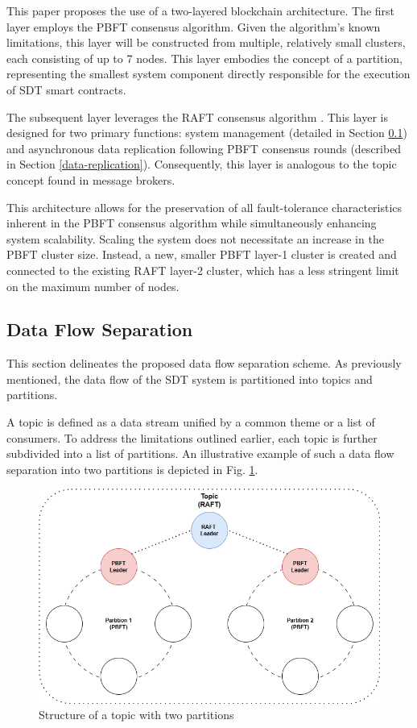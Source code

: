 \documentclass[10pt]{llncs}
\begin{document}
This paper proposes the use of a two-layered blockchain architecture. 
The first layer employs the PBFT consensus algorithm.  
Given the algorithm's known limitations, this layer will be constructed from multiple, relatively small clusters, each consisting of up to 7 nodes. 
This layer embodies the concept of a partition, representing the smallest system component directly responsible for the execution of SDT smart contracts.

The subsequent layer leverages the RAFT consensus algorithm \cite{ongaro2015raft}. 
This layer is designed for two primary functions: system management (detailed in Section \ref{data-flow}) and asynchronous data replication following PBFT consensus rounds (described in Section \ref{data-replication}). 
Consequently, this layer is analogous to the topic concept found in message brokers.

This architecture allows for the preservation of all fault-tolerance characteristics inherent in the PBFT consensus algorithm while simultaneously enhancing system scalability. 
Scaling the system does not necessitate an increase in the PBFT cluster size. 
Instead, a new, smaller PBFT layer-1 cluster is created and connected to the existing RAFT layer-2 cluster, which has a less stringent limit on the maximum number of nodes.

\subsection{Data Flow Separation}\label{data-flow}

This section delineates the proposed data flow separation scheme. 
As previously mentioned, the data flow of the SDT system is partitioned into topics and partitions.

A topic is defined as a data stream unified by a common theme or a list of consumers. 
To address the limitations outlined earlier, each topic is further subdivided into a list of partitions.
 An illustrative example of such a data flow separation into two partitions is depicted in Fig. \ref{blockchain_layers}.

\begin{figure}
    \includegraphics[width=\textwidth]{two-layered-blockchain.png}
    \caption{Structure of a topic with two partitions} \label{blockchain_layers}
\end{figure}
\end{document}
